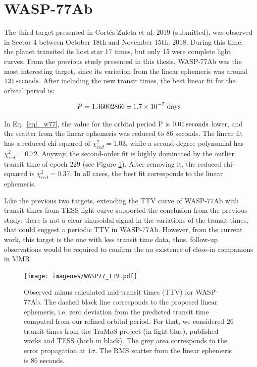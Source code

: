 \section{WASP-77Ab}

The third target presented in Cortés-Zuleta et al. 2019 (submitted), was observed in Sector 4 between October 18th and November 15th, 2018.  During this time, the planet transited its host star 17 times, but only 15 were complete light curves. From the previous study presented in this thesis, WASP-77Ab was the most interesting target, since its variation from the linear ephemeris was around  $121\,\rm seconds$.  After including the new transit times, the best linear fit for the orbital period is:

\begin{equation}
P = 1.36002866 \pm 1.7\times10^{-7} ~\rm days
\end{equation}

In Eq.~\ref{eq1_w77}, the value for the orbital period P is $0.01\,\rm seconds$ lower, and the scatter from the linear ephemeris was reduced to 86 seconds. The linear fit has a reduced chi-squared of $\chi^2_{red}=1.03$, while a second-degree polynomial has $\chi^2_{red}=0.72$. Anyway, the second-order fit is highly dominated by the outlier transit time of epoch $229$ (see Figure \ref{wasp77_ttv}). After removing it, the reduced chi-squared is  $\chi^2_{red}=0.37$. In all cases, the best fit corresponds to the linear ephemeris.

Like the previous two targets, extending the TTV curve of WASP-77Ab with transit times from TESS light curve supported the conclusion from the previous study: there is not a clear sinusoidal signal in the variations of the transit times, that could suggest a periodic TTV in WASP-77Ab. However, from the current work, this target is the one with less transit time data, thus, follow-up observations would be required to confirm the no existence of close-in companions in MMR.


\begin{figure}[ht]
\texttt{[image: imagenes/WASP77\_TTV.pdf]}
\caption{Observed minus calculated mid-transit times (TTV) for WASP-77Ab. The dashed black line corresponds to the proposed linear ephemeris, i.e. zero deviation from the predicted transit time  computed from our refined orbital period. For that, we considered 26 transit times from the TraMoS project (in light blue), published works and TESS (both in black). The grey area corresponds to the error propagation at $1\sigma$. The RMS scatter from the linear ephemeris is 86 seconds.}
\label{wasp77_ttv}
\end{figure}



